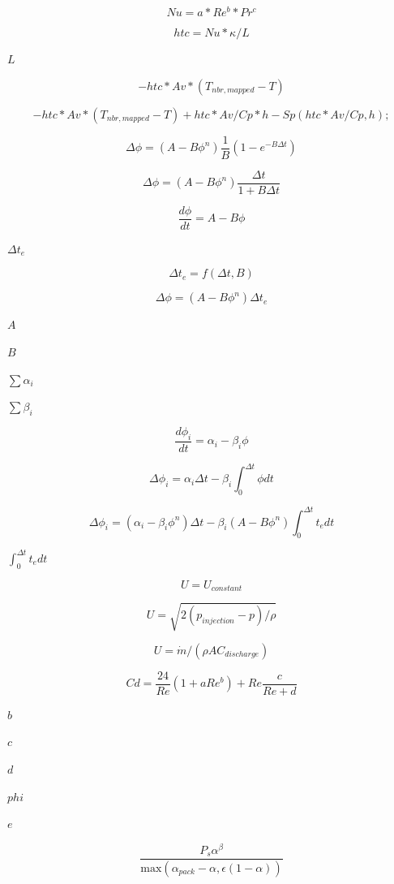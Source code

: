 \documentclass{article}
\begin{document}
\[
        Nu = a*Re^b*Pr^c
    \]
\pagebreak

\[
        htc = Nu*\kappa/L
    \]
\pagebreak

$        L      $
\pagebreak

\[
    -htc*Av*(T_{nbr,mapped} - T)
\]
\pagebreak

\[
    -htc*Av*(T_{nbr,mapped} - T) + htc*Av/Cp*h - Sp(htc*Av/Cp, h);
\]
\pagebreak

\[
    \Delta \phi = (A - B \phi^n) \frac{1}{B} (1 - e^{- B \Delta t})
\]
\pagebreak

\[
    \Delta \phi = (A - B \phi^n) \frac{\Delta t}{1 + B \Delta t}
\]
\pagebreak

\[
        \frac{d \phi}{d t} = A - B \phi
    \]
\pagebreak

$\Delta
t_e$
\pagebreak

\[
        \Delta t_e = f(\Delta t, B)
    \]
\pagebreak

\[
        \Delta \phi = (A - B \phi^n) \Delta t_e
    \]
\pagebreak

$A$
\pagebreak

$B$
\pagebreak

$\sum \alpha_i$
\pagebreak

$\sum \beta_i$
\pagebreak

\[
        \frac{d \phi_i}{d t} = \alpha_i - \beta_i \phi
    \]
\pagebreak

\[
        \Delta \phi_i = \alpha_i \Delta t -
        \beta_i \int_0^{\Delta t} \phi d t
    \]
\pagebreak

\[
        \Delta \phi_i = (\alpha_i - \beta_i \phi^n) \Delta t -
        \beta_i (A - B \phi^n) \int_0^{\Delta t} t_e dt
    \]
\pagebreak

$\int_0^{\Delta t} t_e dt$
\pagebreak

\[
U = U_{constant}
\]
\pagebreak

\[
U = \sqrt{2(p_{injection} - p)/\rho}
\]
\pagebreak

\[
U = \dot{m}/(\rho A C_{discharge})
\]
\pagebreak

\[
    Cd = \frac{24}{Re} (1 + a Re^{b}) + Re \frac{c}{Re + d}
\]
\pagebreak

$b$
\pagebreak

$c$
\pagebreak

$d$
\pagebreak

$phi$
\pagebreak

$e$
\pagebreak

\[
    \frac{P_s \alpha^\beta}{ \mathrm{max} \left( \alpha_{pack} - \alpha ,
    \epsilon ( 1 - \alpha ) \right) }
\]
\pagebreak
\end{document}
